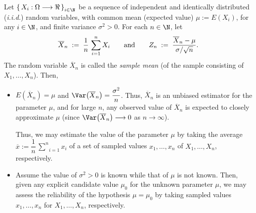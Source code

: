 \documentclass{article}
\begin{document}
Let $\left\{\,X_{i} : \Omega\longrightarrow\Re\,\right\}_{i\in\N}$ be a sequence of independent and identically distributed (\emph{i.i.d.}) random variables, with common mean (expected value) $\mu := E\!\left(X_{i}\right)$, for any $i\in\N$, and finite variance $\sigma^{2} > 0$.  For each $n\in\N$, let
\begin{equation*}
\overline{X}_{n} \; := \; \dfrac{1}{n}\,\sum_{i=1}^{n}X_{i}
\quad\quad\textnormal{and}\quad\quad
Z_{n} \; := \; \dfrac{\overline{X}_{n}-\mu}{\sigma/\sqrt{n}}.
\end{equation*}
The random variable $\overline{X}_{n}$ is called the \emph{sample mean} (of the sample consisting of $X_{1}, \ldots, X_{n}$).  Then,
\begin{itemize}
\item  $E\!\left(\overline{X}_{n}\right) = \mu$ and $\Var\!\left(\overline{X}_{n}\right) = \dfrac{\sigma^{2}}{n}$.
          Thus, $\overline{X}_{n}$ is an unbiased estimator for the parameter $\mu$, and
          for large $n$, any observed value of $\overline{X}_{n}$ is expected to closely approximate $\mu$
          (since $\Var\!\left(\overline{X}_{n}\right)\longrightarrow 0$ as $n \longrightarrow \infty$).

          Thus, we may estimate the value of the parameter $\mu$ by taking the average
          $\overline{x} := \dfrac{1}{n}\,\underset{i=1}{\overset{n}{\sum}}x_{i}$ of a set of sampled values
          $x_{1}, \ldots, x_{n}$ of $X_{1}, \ldots, X_{n}$, respectively.
          
\item  Assume the value of $\sigma^{2} > 0$ is known while that of $\mu$ is not known.
          Then, given any explicit candidate value $\mu_{0}$ for the unknown parameter $\mu$,
          we may assess the reliability of the hypothesis $\mu=\mu_{0}$ by taking sampled
          values $x_{1}, \ldots, x_{n}$ for $X_{1}, \ldots, X_{n}$, respectively.


\end{itemize}
\end{document}
